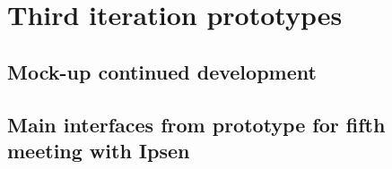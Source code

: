 \chapter{Third iteration prototypes}
\section{Mock-up continued development}\label{sec:2Mock}


\section{Main interfaces from prototype for fifth meeting with Ipsen}\label{sec:3prototype}